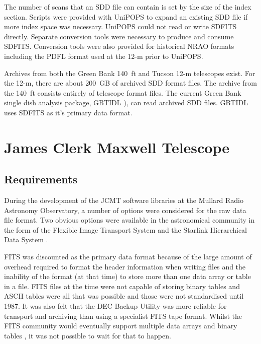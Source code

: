 \documentclass[final,authoryear,5p,times,twocolumn]{elsarticle}
\newcommand{\ascl}[1]{\href{http://www.ascl.net/#1}{ascl:#1}}
\begin{document}
The number of scans that an SDD file can contain is set
by the size of the index section.  Scripts were provided with UniPOPS
to expand an existing SDD file if more index space was necessary.
UniPOPS could not read or write SDFITS directly. Separate conversion tools 
were necessary to produce and consume SDFITS.  Conversion tools were also 
provided for historical NRAO formats including the PDFL format
used at the 12-m prior to UniPOPS.

Archives from both the Green Bank 140\, ft and Tucson 12-m telescopes
exist.  For the 12-m, there are about 200\, GB of archived SDD format
files.  The archive from the 140\, ft consists entirely of telescope
format files.  The current Green Bank single dish analysis package,
GBTIDL \citep[][\ascl{1303.019}]{2006ASPC..351..512M}), can read
archived SDD files.  GBTIDL uses SDFITS as it's primary data format.

\section{James Clerk Maxwell Telescope}

\subsection{Requirements}

During the development of the JCMT software libraries at the Mullard
Radio Astronomy Observatory, a number of options were considered for
the raw data file format.  Two obvious options were available in the
astronomical community in the form of the Flexible Image Transport System
\citep[FITS;][]{1981A&AS...44..363W} and the Starlink Hierarchical
Data System \citep[HDS;][\ascl{1502.009}]{1982QJRAS..23..485D,2015HDS}.

FITS was discounted as the primary data format because of the large
amount of overhead required to format the header information when
writing files and the inability of the format (at that time) to store
more than one data array or table in a file. FITS files at the time
were not capable of storing binary tables and ASCII tables were all
that was possible \citep{1988A&AS...73..365H} and those were not
standardised until 1987. It was also felt that the DEC Backup Utility
was more reliable for transport and archiving than using a specialist
FITS tape format. Whilst the FITS community would eventually support
multiple data arrays \citep{1988A&AS...73..359G} and binary tables
\citep{1995A&AS..113..159C}, it was not possible to wait for that to
happen.
\end{document}
